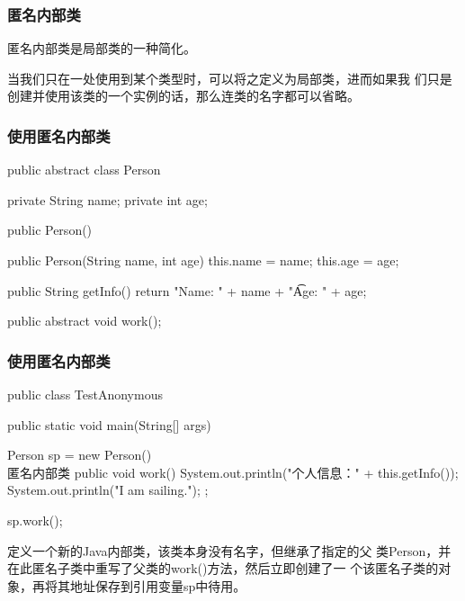 \begin{frame}[fragile] %
\frametitle{匿名内部类}

匿名内部类是局部类的一种简化。

{\kai 当我们只在一处使用到某个类型时，可以将之定义为局部类，进而如果我
  们只是创建并使用该类的一个实例的话，那么连类的名字都可以省略。}
\end{frame}

\begin{frame}[fragile] %
  \frametitle{使用匿名内部类}


  \begin{javaCode}
    public abstract class Person {
      private String name;
      private int age;
      
      public Person() {}
      
      public Person(String name, int age) {
        this.name = name;
        this.age = age;
      }
      
      public String getInfo() {
        return "Name: " + name + "\t Age: " + age;
      }
      
      public abstract void work();
    }  
  \end{javaCode}
\end{frame}

\begin{frame}[fragile] %
  \frametitle{使用匿名内部类}


  \begin{javaCode}
    public class TestAnonymous {
      public static void main(String[] args) {
        Person sp = new Person() { \\ 匿名内部类
          public void work() {
            System.out.println("个人信息：" + this.getInfo());
            System.out.println("I am sailing.");
          }
        };
        
        sp.work();
      }
    }
  \end{javaCode}

  \pause
  

  {\small\Red 定义一个新的Java内部类，该类本身没有名字，但继承了指定的父
    类Person，并在此匿名子类中重写了父类的work()方法，然后立即创建了一
    个该匿名子类的对象，再将其地址保存到引用变量sp中待用。}
\end{frame}

